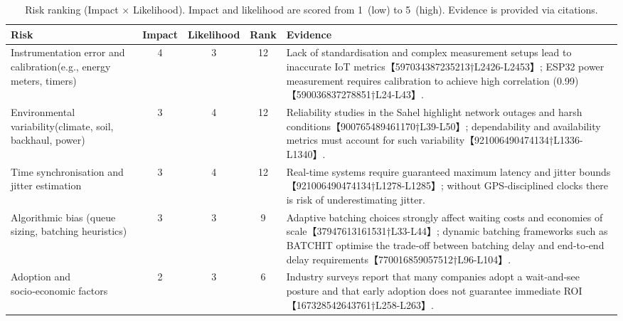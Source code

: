 \begin{table}[h]
  \centering
  \caption{Risk ranking (Impact \(\times\) Likelihood).  Impact and likelihood are scored from 1~(low) to 5~(high).  Evidence is provided via citations.}
  \label{tab:risk-table}
  \begin{tabular}{p{4cm}cccp{5cm}}
    \toprule
    \textbf{Risk} & \textbf{Impact} & \textbf{Likelihood} & \textbf{Rank} & \textbf{Evidence} \\
    \midrule
    Instrumentation error and calibration\newline (e.g., energy meters, timers) & 4 & 3 & 12 & Lack of standardisation and complex measurement setups lead to inaccurate IoT metrics【597034387235213†L2426-L2453】; ESP32 power measurement requires calibration to achieve high correlation (0.99)【590036837278851†L24-L43】. \\
    Environmental variability\newline (climate, soil, backhaul, power) & 3 & 4 & 12 & Reliability studies in the Sahel highlight network outages and harsh conditions【900765489461170†L39-L50】; dependability and availability metrics must account for such variability【921006490474134†L1336-L1340】. \\
    Time synchronisation and jitter estimation & 3 & 4 & 12 & Real‑time systems require guaranteed maximum latency and jitter bounds【921006490474134†L1278-L1285】; without GPS‑disciplined clocks there is risk of underestimating jitter. \\
    Algorithmic bias (queue sizing, batching heuristics) & 3 & 3 & 9 & Adaptive batching choices strongly affect waiting costs and economies of scale【37947613161531†L33-L44】; dynamic batching frameworks such as BATCHIT optimise the trade‑off between batching delay and end‑to‑end delay requirements【770016859057512†L96-L104】. \\
    Adoption and socio‑economic factors & 2 & 3 & 6 & Industry surveys report that many companies adopt a wait‑and‑see posture and that early adoption does not guarantee immediate ROI【167328542643761†L258-L263】. \\
    \bottomrule
  \end{tabular}
\end{table}

